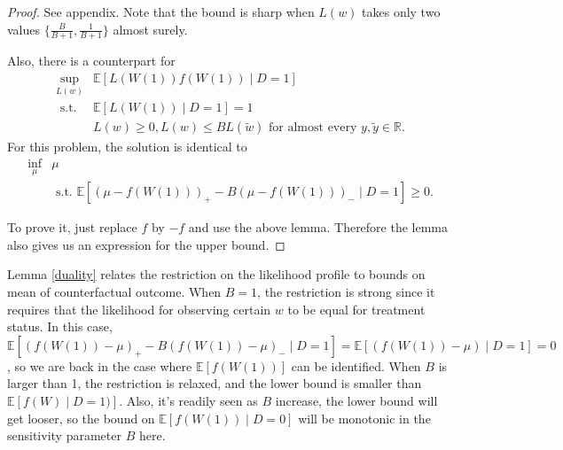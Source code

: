 \documentclass[12pt]{article}
\newcommand{\Ep}{\mathbb{E}}
\begin{document}
	\begin{proof}
		See appendix. Note that the bound is sharp when $L(w)$
		takes only two values $\{\frac{B}{B + 1}, \frac{1}{B + 1}\}$ almost surely.
		
		Also, there is a counterpart for \begin{equation*}
		\begin{array}{ll}
		\sup _{L(w)} & \mathbb{E}[L(W(1))f(W(1)) \mid D=1] \\
		\text { s.t. } & \mathbb{E}[L(W(1)) \mid D=1]=1 \\
		& L(w) \geq 0, L(w) \leq B L(\tilde{w}) \text { for almost every } y, \tilde{y} \in \mathbb{R}.
		\end{array}
		\end{equation*}
		For this problem, the solution is identical to \begin{equation*}
		\begin{array}{ll}
		\inf _{\mu} & \mu \\
		& \text { s.t. }  \mathbb{E}\left[(\mu-f(W(1)))_{+}-B(\mu-f(W(1)))_{-} \mid D=1\right] \geq 0.
		\end{array}
		\end{equation*}
		
		To prove it, just replace $f$ by $-f$ and use the above lemma. Therefore the lemma also gives us an expression for the upper bound.
	\end{proof}
	
	Lemma \ref{duality} relates the restriction on the likelihood profile to bounds on mean of counterfactual outcome. When $B = 1$, the restriction is strong since it requires that the likelihood for observing certain $w$ to be equal for treatment status. In this case, $\mathbb{E}\left[(f(W(1))-\mu)_{+}-B(f(W(1))-\mu)_{-} \mid D=1\right] = \mathbb{E}\left[(f(W(1))-\mu) \mid D=1\right] = 0$, so we are back in the case where $\Ep[f(W(1))]$ can be identified. When $B$ is larger than 1, the restriction is relaxed, and the lower bound is smaller than $\Ep[f(W) \mid D = 1)]$. Also, it's readily seen as $B$ increase, the lower bound will get looser, so the bound on $\Ep[f(W(1)) \mid D = 0]$ will be monotonic in the sensitivity parameter $B$ here. 
\end{document}
